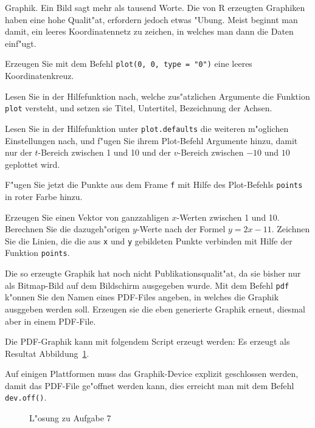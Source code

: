 Graphik. Ein Bild sagt mehr als tausend Worte. Die von R erzeugten
Graphiken haben eine hohe Qualit"at, erfordern jedoch etwas "Ubung.
Meist beginnt man damit, ein leeres Koordinatennetz zu zeichen, in welches
man dann die Daten einf"ugt.
\begin{teilaufgaben}
\item Erzeugen Sie mit dem Befehl \verb+plot(0, 0, type = "0")+ eine
leeres Koordinatenkreuz.
\item Lesen Sie in der Hilfefunktion nach, welche zus"atzlichen
Argumente die Funktion {\tt plot} versteht, und setzen sie Titel,
Untertitel, Bezeichnung der Achsen.
\item Lesen Sie in der Hilfefunktion unter {\tt plot.defaults} die
weiteren m"oglichen Einstellungen nach, und f"ugen Sie ihrem Plot-Befehl
Argumente hinzu, damit nur der $t$-Bereich zwischen 1 und 10 und der
$v$-Bereich zwischen $-10$ und $10$ geplottet wird.
\item F"ugen Sie jetzt die Punkte aus dem Frame {\tt f} mit Hilfe des
Plot-Befehls {\tt points} in roter Farbe hinzu.
\item Erzeugen Sie einen Vektor von ganzzahligen $x$-Werten zwischen 1
und 10. Berechnen Sie die dazugeh"origen $y$-Werte nach der Formel $y=2x-11$.
Zeichnen Sie die Linien, die die aus {\tt x} und {\tt y} gebildeten
Punkte verbinden mit Hilfe der Funktion {\tt points}.
\item Die so erzeugte Graphik hat noch nicht Publikationsqualit"at, da
sie bisher nur als Bitmap-Bild auf dem Bildschirm ausgegeben wurde.
Mit dem Befehl {\tt pdf} k"onnen Sie den Namen eines PDF-Files angeben,
in welches die Graphik ausggeben werden soll. Erzeugen sie die eben
generierte Graphik erneut, diesmal aber in einem PDF-File.
\end{teilaufgaben}

\begin{loesung}
Die PDF-Graphik kann mit folgendem Script erzeugt werden:
Es erzeugt als Resultat Abbildung~\ref{r0000007:aufg7}.

Auf einigen Plattformen muss das Graphik-Device explizit geschlossen
werden, damit das PDF-File ge"offnet werden kann, dies erreicht man
mit dem Befehl {\tt dev.off()}.
\begin{figure}
\begin{center}
\end{center}
\caption{L"osung zu Aufgabe 7\label{r0000007:aufg7}}
\end{figure}
\end{loesung}

